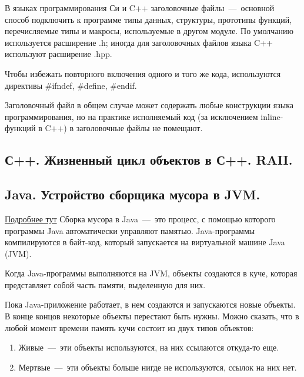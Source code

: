 \documentclass{article}
\begin{document}
В языках программирования Си и C++ заголовочные файлы~---~основной способ подключить к программе типы данных, структуры, прототипы функций, перечисляемые типы и макросы, используемые в другом модуле. По умолчанию используется расширение .h; иногда для заголовочных файлов языка C++ используют расширение .hpp.

Чтобы избежать повторного включения одного и того же кода, используются директивы \#ifndef, \#define, \#endif.

Заголовочный файл в общем случае может содержать любые конструкции языка программирования, но на практике исполняемый код (за исключением inline-функций в C++) в заголовочные файлы не помещают.

\subsection{С++. Жизненный цикл объектов в С++. RAII.}

\subsection{Java. Устройство сборщика мусора в JVM.}

\href{https://medium.com/nuances-of-programming/%D1%81%D0%B1%D0%BE%D1%80%D0%BA%D0%B0-%D0%BC%D1%83%D1%81%D0%BE%D1%80%D0%B0-%D0%B2-java-%D1%87%D1%82%D0%BE-%D1%8D%D1%82%D0%BE-%D1%82%D0%B0%D0%BA%D0%BE%D0%B5-%D0%B8-%D0%BA%D0%B0%D0%BA-%D1%80%D0%B0%D0%B1%D0%BE%D1%82%D0%B0%D0%B5%D1%82-%D0%B2-jvm-25bb2570b44c}{Подробнее тут}
Сборка мусора в Java~---~это процесс, с помощью которого программы Java автоматически управляют памятью. Java-программы компилируются в байт-код, который запускается на виртуальной машине Java (JVM).

Когда Java-программы выполняются на JVM, объекты создаются в куче, которая представляет собой часть памяти, выделенную для них.

Пока Java-приложение работает, в нем создаются и запускаются новые объекты. В конце концов некоторые объекты перестают быть нужны. Можно сказать, что в любой момент времени память кучи состоит из двух типов объектов:
\begin{enumerate}
	\item Живые~---~эти объекты используются, на них ссылаются откуда-то еще.
	\item Мертвые~---~эти объекты больше нигде не используются, ссылок на них нет.
\end{enumerate}
\end{document}
